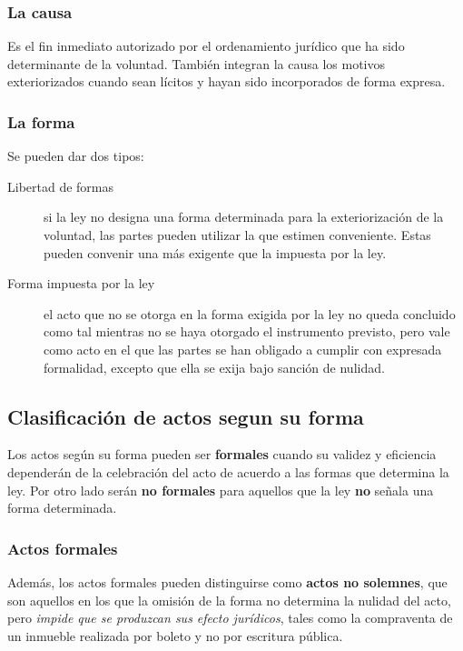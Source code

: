 \documentclass[../main.tex]{subfiles}
\begin{document}
\subsubsection{La causa}

Es el fin inmediato autorizado por el ordenamiento jurídico que ha sido determinante 
de la voluntad. También integran la causa los motivos exteriorizados cuando sean
lícitos y hayan sido incorporados de forma expresa.

\subsubsection{La forma}
Se pueden dar dos tipos:

\begin{description}
  \item[Libertad de formas] si la ley no designa una forma determinada para la
    exteriorización de la voluntad, las partes pueden utilizar la que estimen
    conveniente. Estas pueden convenir una más exigente que la impuesta por la ley.
  \item[Forma impuesta por la ley]  el acto que no se otorga en la forma exigida
    por la ley no queda concluido como tal mientras no se haya otorgado el 
    instrumento previsto, pero vale como acto en el que las partes se han 
    obligado a cumplir con expresada formalidad, excepto que ella se exija bajo
    sanción de nulidad.
\end{description}

\subsection{Clasificación de actos segun su forma}

Los actos según su forma pueden ser \textbf{formales} cuando su validez y eficiencia
dependerán de la celebración del acto de acuerdo a las formas que determina la
ley. Por otro lado serán \textbf{no formales} para aquellos que la ley \textbf{no}
señala una forma determinada.

\subsubsection{Actos formales}

Además, los actos formales pueden distinguirse como \textbf{actos no solemnes},
que son aquellos en los que la omisión de la forma no determina la nulidad del
acto, pero \textit{impide que se produzcan sus efecto jurídicos}, tales como
la compraventa de un inmueble realizada por boleto y no por escritura pública.
\end{document}
